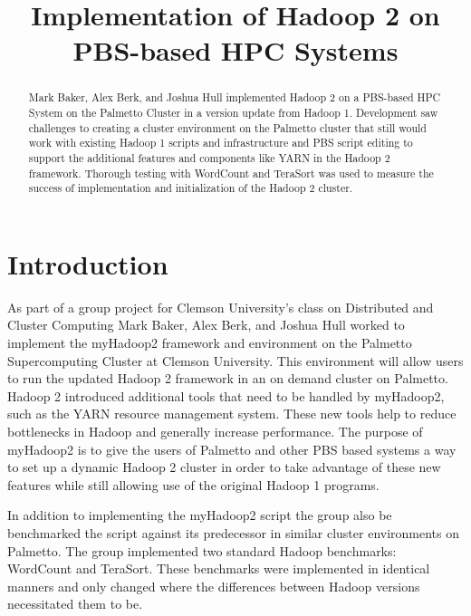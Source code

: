\documentclass[conference]{IEEEtran}
\begin{document}
	\title{Implementation of Hadoop 2 on PBS-based HPC Systems}
	\author{
	}

	\maketitle

	\begin{abstract}
		Mark Baker, Alex Berk, and Joshua Hull implemented Hadoop 2 on a PBS-based HPC System on the Palmetto Cluster in a version update from Hadoop 1. Development saw challenges to creating a cluster environment on the Palmetto cluster that still would work with existing Hadoop 1 scripts and infrastructure and PBS script editing to support the additional features and components like YARN in the Hadoop 2 framework. Thorough testing with WordCount and TeraSort was used to measure the success of implementation and initialization of the Hadoop 2 cluster.
	\end{abstract}

	\section{Introduction}
		As part of a group project for Clemson University's class on Distributed and Cluster Computing Mark Baker, Alex Berk, and Joshua Hull worked to implement the myHadoop2 framework and environment on the Palmetto Supercomputing Cluster at Clemson University. This environment will allow users to run the updated Hadoop 2 framework in an on demand cluster on Palmetto. Hadoop 2 introduced additional tools that need to be handled by myHadoop2, such as the YARN resource management system. These new tools help to reduce bottlenecks in Hadoop and generally increase performance. The purpose of myHadoop2 is to give the users of Palmetto and other PBS based systems a way to set up a dynamic Hadoop 2 cluster in order to take advantage of these new features while still allowing use of the original Hadoop 1 programs.


        In addition to implementing the myHadoop2 script the group also be benchmarked the script against its predecessor in similar cluster environments on Palmetto. The group implemented two standard Hadoop benchmarks: WordCount and TeraSort. These benchmarks were implemented in identical manners and only changed where the differences between Hadoop versions necessitated them to be.
\end{document}
